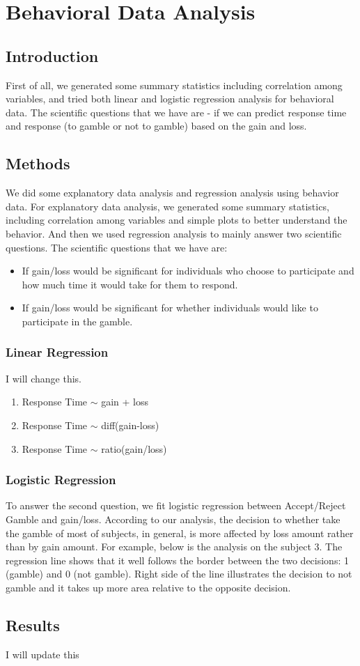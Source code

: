 \section{Behavioral Data Analysis}
\subsection{Introduction}
\noindent
First of all, we generated some summary statistics including correlation among variables, and tried both linear and logistic regression analysis for behavioral data. The scientific questions that we have are - if we can predict response time and response (to gamble or not to gamble) based on the gain and loss.

\subsection{Methods}
\noindent
We did some explanatory data analysis and regression analysis using behavior 
data. For explanatory data analysis, we generated some summary statistics, 
including correlation among variables and simple plots to better understand 
the behavior. And then we used regression analysis to mainly answer two 
scientific questions. The scientific questions that we have are:
\begin{itemize}
\item If gain/loss would be significant for individuals who choose to 
participate and how much time it would take for them to respond.
\item If gain/loss would be significant for whether individuals would like to 
participate in the gamble. 
\end {itemize}

\subsubsection {Linear Regression}
I will change this.
\begin{enumerate}
\item  Response Time $\sim$ gain + loss
\item  Response Time $\sim$ diff(gain-loss)
\item  Response Time $\sim$ ratio(gain/loss)
\end {enumerate}

\subsubsection {Logistic Regression}
\noindent
To answer the second question, we fit logistic regression between Accept/Reject
Gamble and gain/loss. According to our analysis, the decision to whether take 
the gamble of most of subjects, in general, is more affected by loss amount 
rather than by gain amount.  For example, below is the analysis on the subject 
3. The regression line shows that it well follows the border between the two 
decisions: 1 (gamble) and 0 (not gamble). Right side of the line illustrates 
the decision to not gamble and it takes up more area relative to the opposite 
decision.


\subsection {Results}
I will update this





